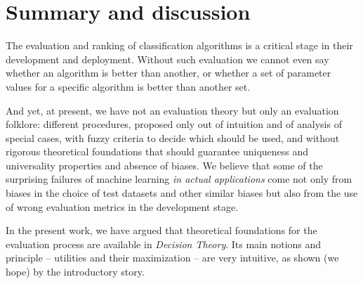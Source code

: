 \documentclass[\ifafour a4paper,12pt,\else a5paper,10pt,\fi%
onecolumn,oneside,article,%
british%
]{memoir}
\theoremstyle{remark}
\theoremstyle{innote}
\renewcommand*{\|}[1][]{\nonscript\:#1\vert\nonscript\:\mathopen{}}
\newcommand*{\eg}{{e.g.}}
\begin{document}
\section{Summary and discussion}
\label{sec:discussion}

The evaluation and ranking of classification algorithms is a critical stage in their development and deployment. Without such evaluation we cannot even say whether an algorithm is better than another, or whether a set of parameter values for a specific algorithm is better than another set.

And yet, at present, we have not an evaluation theory but only an evaluation folklore: different procedures, proposed only out of intuition and of analysis of special cases, with fuzzy criteria to decide which should be used, and without rigorous theoretical foundations that should guarantee uniqueness and universality properties and absence of biases. We believe that some of the surprising failures of machine learning \emph{in actual applications}\autocites[see \eg][]{varoquauxetal2022} come not only from biases in the choice of test datasets and other similar biases but also from the use of wrong evaluation metrics in the development stage.

In the present work, we have argued that theoretical foundations for the evaluation process are available in \emph{Decision Theory}. Its main notions and principle -- utilities and their maximization -- are very intuitive, as shown (we hope) by the introductory story.
\end{document}
